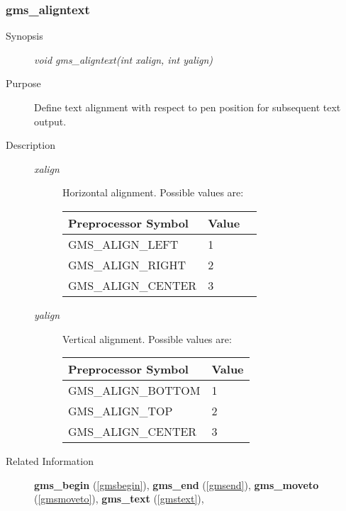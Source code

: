 \subsubsection{gms\_aligntext\label{gmsaligntext}}
\begin{description}
\item[Synopsis]\mbox{}


{\em void    gms\_aligntext(int xalign,  int yalign)\/}
\item[Purpose]\mbox{}


Define text alignment with respect to pen position
for subsequent text output. 
\item[Description]\mbox{}


\begin{description}

\item[{\em xalign\/}]\mbox{}

 Horizontal alignment. Possible values are:

\begin{center}
\begin{tabular}{lll}\hline
Preprocessor Symbol & Value\\ 
\hline
GMS\_ALIGN\_LEFT & 1 \\ 
GMS\_ALIGN\_RIGHT & 2 \\ 
GMS\_ALIGN\_CENTER & 3 \\ 
\hline\end{tabular}
\end{center}


\item[{\em yalign\/}]\mbox{}

 Vertical alignment. Possible values are:
\begin{center}
\begin{tabular}{ll}\hline
Preprocessor Symbol & Value\\ 
\hline
GMS\_ALIGN\_BOTTOM & 1 \\ 
GMS\_ALIGN\_TOP & 2 \\ 
GMS\_ALIGN\_CENTER & 3 \\ 
\hline\end{tabular}
\end{center}
\end{description}

\item[Related Information]\mbox{}


{\bf gms\_begin} (\ref{gmsbegin}), 
{\bf gms\_end} (\ref{gmsend}), 
{\bf gms\_moveto} (\ref{gmsmoveto}), 
{\bf gms\_text} (\ref{gmstext}), 
\end{description}



